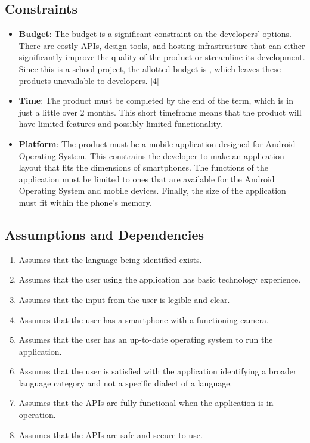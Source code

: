 
\subsection{Constraints}
\label{sub:constraints}
\begin{itemize}
	\item \textbf{Budget}: The budget is a significant constraint on the developers' options. There are costly APIs, design tools, and hosting infrastructure that can either significantly improve the quality of the product or streamline its development. Since this is a school project, the allotted budget is , which leaves these products unavailable to developers. [4]
	\item \textbf{Time}: The product must be completed by the end of the term, which is in just a little over 2 months. This short timeframe means that the product will have limited features and possibly limited functionality.
	\item \textbf{Platform}: The product must be a mobile application designed for Android Operating System. This constrains the developer to make an application layout that fits the dimensions of smartphones. The functions of the application must be limited to ones that are available for the Android Operating System and mobile devices. Finally, the size of the application must fit within the phone's memory.
\end{itemize}


\subsection{Assumptions and Dependencies}
\label{sub:assumptions_and_dependencies}
\begin{enumerate}[1.]
	\item Assumes that the language being identified exists.
	\item Assumes that the user using the application has basic technology experience.
	\item Assumes that the input from the user is legible and clear.
	\item Assumes that the user has a smartphone with a functioning camera.
	\item Assumes that the user has an up-to-date operating system to run the application.
	\item Assumes that the user is satisfied with the application identifying a broader language category and not a specific dialect of a language.
	\item Assumes that the APIs are fully functional when the application is in operation.
	\item Assumes that the APIs are safe and secure to use.
\end{enumerate}




